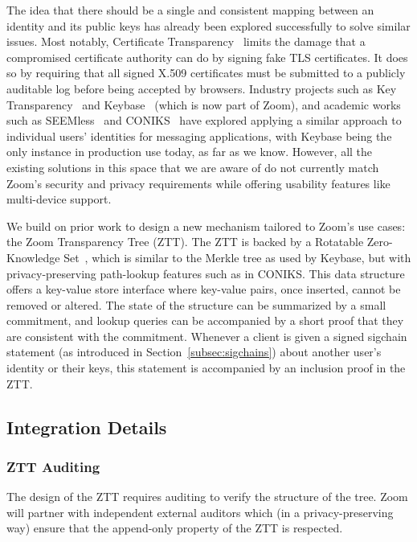 The idea that there should be a single and consistent mapping between an
identity and its public keys has already been explored successfully to solve
similar issues. Most notably, Certificate
Transparency~\cite{langley2013certificate} limits the damage that a compromised
certificate authority can do by signing fake TLS certificates. It does so by
requiring that all signed X.509 certificates must be submitted to a
publicly auditable log before being accepted by browsers. Industry projects such
as Key Transparency~\cite{keytransparency} and Keybase~\cite{keybase} (which is
now part of Zoom), and academic works such as SEEMless~\cite{chase2019seemless}
and CONIKS~\cite{melara2015coniks} have explored applying a similar approach to
individual users' identities for messaging applications, with Keybase being the
only instance in production use today, as far as we know. However, all the
existing solutions in this space that we are aware of do not currently match
Zoom's security and privacy requirements while offering usability features like
multi-device support.

We build on prior work to design a new mechanism tailored to Zoom's use
cases: the Zoom Transparency Tree (ZTT). The ZTT is backed by a Rotatable
Zero-Knowledge Set~\cite{rzks}, which is similar to the Merkle
tree as used by Keybase, but with privacy-preserving path-lookup features such
as in CONIKS. This data structure offers a key-value store interface where
key-value pairs, once inserted, cannot be removed or altered. The state of the
structure can be summarized by a small commitment, and lookup queries can be
accompanied by a short proof that they are consistent with the commitment.
Whenever a client is given a signed sigchain statement (as introduced in
Section~\ref{subsec:sigchains}) about another user's identity or their keys,
this statement is accompanied by an inclusion proof in the ZTT.

\subsection{Integration Details}

\subsubsection{ZTT Auditing}\label{subsec:zttaudit}

The design of the ZTT requires auditing to verify the structure of the tree. Zoom will partner with
independent external auditors which (in a privacy-preserving way) ensure that the append-only
property of the ZTT is respected.

